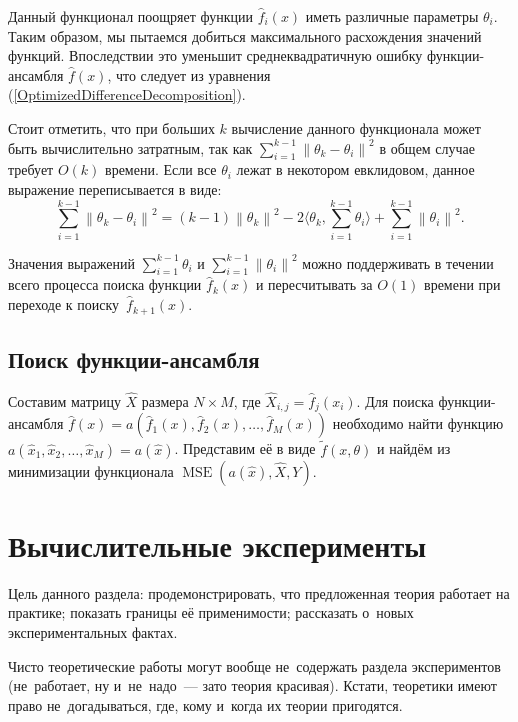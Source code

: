 \documentclass[12pt, fleqn]{article}
\newcommand{\norm}[1]{\left\lVert#1\right\rVert}
\newcommand{\mse}{\mathop{MSE}}
\newcommand{\scalarproduct}[1]{\langle #1 \rangle}
\newcommand{\optimizationmethodfunction}{\tilde{f}}
\newcommand{\predictionfunction}{\hat{f}}
\newcommand{\ensemblefunction}{a}
\newcommand{\objects}{X}
\newcommand{\results}{Y}
\newcommand{\predictedobjects}{\hat{\objects}}
\newcommand{\numberobjects}{N}
\newcommand{\numberpredictionfunctions}{M}
\newcommand{\for}[3]{\sum\limits_{#1 = #2}^{#3}}  %
\newcommand{\forn}[2]{\for{#1}{1}{#2}}  %
\newcommand{\many}[3]{#1 1 #2, #1 2 #2, \dots, #1 #3 #2}  %
\newcommand{\reference}[1]{(\hyperref[#1]{\ref{#1}})}
\newcommand{\ensemblefunctionfull}{\ensemblefunction(\many{\predictionfunction_}{(x)}{\numberpredictionfunctions})}
\begin{document}
Данный функционал поощряет функции $\predictionfunction_i(x)$ иметь различные параметры $\theta_i$. Таким образом, мы пытаемся добиться максимального расхождения значений функций. Впоследствии это уменьшит среднеквадратичную ошибку функции-ансамбля $\predictionfunction(x)$, что следует из уравнения \reference{OptimizedDifferenceDecomposition}.

Стоит отметить, что при больших $k$ вычисление данного функционала может быть вычислительно затратным, так как $\forn{i}{k - 1}\norm{\theta_k - \theta_i}^2$ в общем случае требует $O(k)$ времени. Если все $\theta_i$ лежат в некотором евклидовом, данное выражение переписывается в виде:
$$
\forn{i}{k - 1}\norm{\theta_k - \theta_i}^2 = (k - 1)\norm{\theta_k}^2 - 2\scalarproduct{\theta_k, \forn{i}{k - 1} \theta_i} + \forn{i}{k - 1}\norm{\theta_i}^2.
$$

Значения выражений $\forn{i}{k - 1} \theta_i$ и $\forn{i}{k - 1}\norm{\theta_i}^2$ можно поддерживать в течении всего процесса поиска функции $\predictionfunction_k(x)$ и пересчитывать за $O(1)$ времени при переходе к поиску~$\predictionfunction_{k+1}(x)$.

\subsection{Поиск функции-ансамбля}

Составим матрицу $\predictedobjects$ размера $\numberobjects \times \numberpredictionfunctions$, где $\predictedobjects_{i, j} = \predictionfunction_j(x_i)$.
Для поиска функции-ансамбля $\predictionfunction(x) = \ensemblefunctionfull$ необходимо найти функцию $\ensemblefunction(\many{\hat{x}_}{}{\numberpredictionfunctions}) = \ensemblefunction(\hat{x})$.
Представим её в виде $\optimizationmethodfunction(x, \theta)$ и найдём из минимизации функционала $\mse(\ensemblefunction(\hat{x}), \predictedobjects, \results)$.

\section{Вычислительные эксперименты}

Цель данного раздела:
продемонстрировать, что предложенная теория работает на практике;
показать границы её применимости;
рассказать о~новых экспериментальных фактах.

Чисто теоретические работы могут вообще не~содержать раздела экспериментов
(не~работает, ну и~не~надо~--- зато теория красивая).
Кстати, теоретики имеют право не~догадываться, где, кому и~когда их теории пригодятся.
\end{document}
